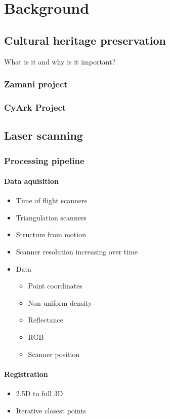 \chapter{Background} \label{ch2}

\section{Cultural heritage preservation}
	What is it and why is it important?
	\subsection{Zamani project}
	\subsection{CyArk Project}

\section{Laser scanning}
	\subsection{Processing pipeline}
		\subsubsection{Data aquisition}
			\begin{itemize}
			\item Time of flight scanners
			\item Triangulation scanners
			\item Structure from motion
			\item Scanner resolution increasing over time
			\item Data
			\begin{itemize}
				\item Point coordinates
				\item Non uniform density
				\item Reflectance
				\item RGB
				\item Scanner position
			\end{itemize}
			\end{itemize}


		\subsubsection{Registration}
			\begin{itemize}
			\item 2.5D to full 3D
			\item Iterative closest points
			\end{itemize}
		
